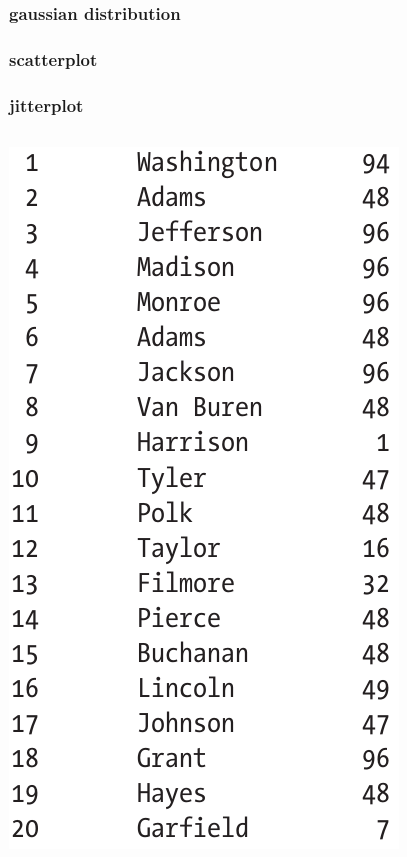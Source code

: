 \documentclass{beamer}
\begin{document}
\begin{frame}
\frametitle{gaussian distribution}
\end{frame}

\begin{frame}
\frametitle{scatterplot}
\end{frame}

\begin{frame}
\frametitle{jitterplot}

\begin{columns}

\begin{column}{0.3\textwidth}
\includegraphics[scale=0.2]{jittertable.png}
\end{column}


\end{columns}
\end{frame}
\end{document}
